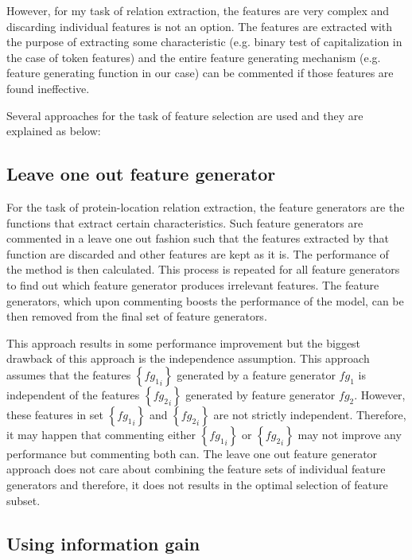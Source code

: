 However, for my task of relation extraction, the features are very complex and discarding individual features is not an option. The features are extracted with the purpose of extracting some characteristic (e.g. binary test of capitalization in the case of token features) and the entire feature generating mechanism (e.g.  feature generating function in our case) can be commented if those features are found ineffective.

Several approaches for the task of feature selection are used and they are explained as below:

\subsection{Leave one out feature generator}\label{subsec:LeaveOneOut}

For the task of protein-location relation extraction, the feature generators are the functions that extract certain characteristics. Such feature generators are commented in a leave one out fashion such that the features extracted by that function are discarded and other features are kept as it is. The performance of the method is then calculated. This process is repeated for all feature generators to find out which feature generator produces irrelevant features. The feature generators, which upon commenting boosts the performance of the model, can be then removed from the final set of feature generators.

This approach results in some performance improvement but the biggest drawback of this approach is the independence assumption. This approach assumes that the features $\left\lbrace {fg_1}_i \right\rbrace$ generated by a feature generator $fg_1$ is independent of the features $\left\lbrace {fg_2}_i \right\rbrace$ generated by feature generator $fg_2$. However, these features in set $\left\lbrace {fg_1}_i \right\rbrace$ and $\left\lbrace {fg_2}_i \right\rbrace$ are not strictly independent. Therefore, it may happen that commenting either $\left\lbrace {fg_1}_i \right\rbrace$ or $\left\lbrace {fg_2}_i \right\rbrace$ may not improve any performance but commenting both can. The leave one out feature generator approach does not care about combining the feature sets of individual feature generators and therefore, it does not results in the optimal selection of feature subset.

\subsection{Using information gain}\label{subsec:IG}

